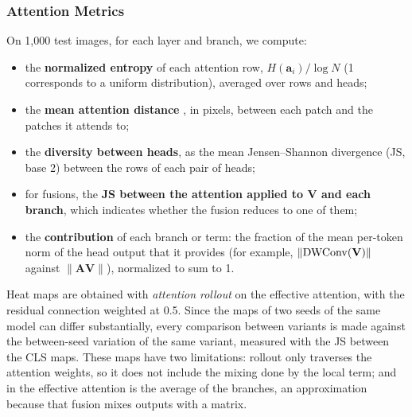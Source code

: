 \subsubsection{Attention Metrics} On 1,000 test images, for each layer and branch, we compute:
\begin{itemize}
  \item the \textbf{normalized entropy} of each attention row, $H(\mathbf{a}_i)/\log N$ (1 corresponds to a uniform distribution), averaged over rows and heads;
  \item the \textbf{mean attention distance} \citep{dosovitskiy2021image}, in pixels, between each patch and the patches it attends to;
  \item the \textbf{diversity between heads}, as the mean Jensen--Shannon divergence (JS, base 2) between the rows of each pair of heads;
  \item for fusions, the \textbf{JS between the attention applied to $\mathbf{V}$ and each branch}, which indicates whether the fusion reduces to one of them;
  \item the \textbf{contribution} of each branch or term: the fraction of the mean per-token norm of the head output that it provides (for example, $\lVert\operatorname{DWConv}(\mathbf{V})\rVert$ against $\lVert\mathbf{A}\mathbf{V}\rVert$), normalized to sum to 1.
\end{itemize}
Heat maps are obtained with \emph{attention rollout} \citep{abnar2020quantifying} on the effective attention, with the residual connection weighted at 0.5. Since the maps of two seeds of the same model can differ substantially, every comparison between variants is made against the between-seed variation of the same variant, measured with the JS between the CLS maps. These maps have two limitations: rollout only traverses the attention weights, so it does not include the mixing done by the local term; and in  the effective attention is the average of the branches, an approximation because that fusion mixes outputs with a matrix.

